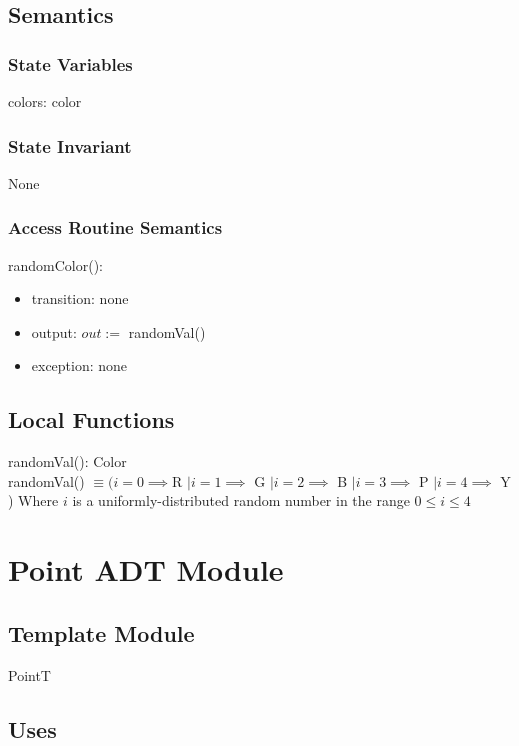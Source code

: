\documentclass[12pt]{article}
\begin{document}
\subsection* {Semantics}

\subsubsection* {State Variables}

colors: color

\subsubsection* {State Invariant}

None

\subsubsection* {Access Routine Semantics}

\noindent randomColor():
\begin{itemize}
\item transition: none
\item output: $out :=$ randomVal()
\item exception: none
\end{itemize}


\subsection*{Local Functions}

\noindent randomVal(): Color\\
\noindent randomVal() $\equiv (i = 0 \implies $R $| i = 1 \implies$ G $| i = 2 \implies$ B $| i = 3 \implies$ P $| i = 4 \implies$ Y ) 
Where $i$ is a uniformly-distributed random number in the range $0 \leq i \leq 4$ \\

\newpage

\section* {Point ADT Module}

\subsection*{Template Module}

PointT

\subsection* {Uses}
\end{document}
